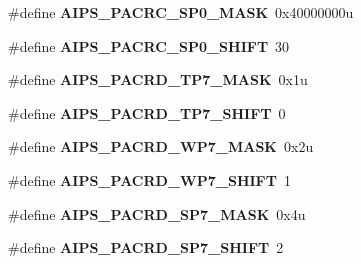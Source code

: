 \begin{DoxyCompactItemize}
\item 
\hypertarget{group___a_i_p_s___register___masks_ga7d1ea8b3754b6cc0e640b1f0d20790a4}{}\#define {\bfseries A\+I\+P\+S\+\_\+\+P\+A\+C\+R\+C\+\_\+\+S\+P0\+\_\+\+M\+A\+S\+K}~0x40000000u\label{group___a_i_p_s___register___masks_ga7d1ea8b3754b6cc0e640b1f0d20790a4}

\item 
\hypertarget{group___a_i_p_s___register___masks_ga1dbf263f8190817a502edfdfa205a582}{}\#define {\bfseries A\+I\+P\+S\+\_\+\+P\+A\+C\+R\+C\+\_\+\+S\+P0\+\_\+\+S\+H\+I\+F\+T}~30\label{group___a_i_p_s___register___masks_ga1dbf263f8190817a502edfdfa205a582}

\item 
\hypertarget{group___a_i_p_s___register___masks_gafb73ac29a92021949417b7bd6bbe5672}{}\#define {\bfseries A\+I\+P\+S\+\_\+\+P\+A\+C\+R\+D\+\_\+\+T\+P7\+\_\+\+M\+A\+S\+K}~0x1u\label{group___a_i_p_s___register___masks_gafb73ac29a92021949417b7bd6bbe5672}

\item 
\hypertarget{group___a_i_p_s___register___masks_ga3a769fd24072d69dda49281bde8aa20f}{}\#define {\bfseries A\+I\+P\+S\+\_\+\+P\+A\+C\+R\+D\+\_\+\+T\+P7\+\_\+\+S\+H\+I\+F\+T}~0\label{group___a_i_p_s___register___masks_ga3a769fd24072d69dda49281bde8aa20f}

\item 
\hypertarget{group___a_i_p_s___register___masks_ga38af2fc3252222dc67267a0a2d675060}{}\#define {\bfseries A\+I\+P\+S\+\_\+\+P\+A\+C\+R\+D\+\_\+\+W\+P7\+\_\+\+M\+A\+S\+K}~0x2u\label{group___a_i_p_s___register___masks_ga38af2fc3252222dc67267a0a2d675060}

\item 
\hypertarget{group___a_i_p_s___register___masks_ga7de67bee4b18ce7b7770bd7cec9bb880}{}\#define {\bfseries A\+I\+P\+S\+\_\+\+P\+A\+C\+R\+D\+\_\+\+W\+P7\+\_\+\+S\+H\+I\+F\+T}~1\label{group___a_i_p_s___register___masks_ga7de67bee4b18ce7b7770bd7cec9bb880}

\item 
\hypertarget{group___a_i_p_s___register___masks_ga81000606b0cc22ee2d16633528d9ff01}{}\#define {\bfseries A\+I\+P\+S\+\_\+\+P\+A\+C\+R\+D\+\_\+\+S\+P7\+\_\+\+M\+A\+S\+K}~0x4u\label{group___a_i_p_s___register___masks_ga81000606b0cc22ee2d16633528d9ff01}

\item 
\hypertarget{group___a_i_p_s___register___masks_ga1541bc5a396ff4757a8075a90b24fc2b}{}\#define {\bfseries A\+I\+P\+S\+\_\+\+P\+A\+C\+R\+D\+\_\+\+S\+P7\+\_\+\+S\+H\+I\+F\+T}~2\label{group___a_i_p_s___register___masks_ga1541bc5a396ff4757a8075a90b24fc2b}


\end{DoxyCompactItemize}
